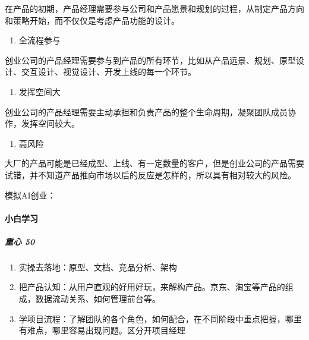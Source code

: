 \documentclass[letterpaper,10pt,english]{sphinxmanual}
\begin{document}
在产品的初期，产品经理需要参与公司和产品愿景和规划的过程，从制定产品方向和策略开始，而不仅仅是考虑产品功能的设计。
\begin{enumerate}
%
\setcounter{enumi}{1}
\item {} 
全流程参与

\end{enumerate}

创业公司的产品经理需要参与到产品的所有环节，比如从产品远景、规划、原型设计、交互设计、视觉设计、开发上线的每一个环节。
\begin{enumerate}
%
\setcounter{enumi}{2}
\item {} 
发挥空间大

\end{enumerate}

创业公司的产品经理需要主动承担和负责产品的整个生命周期，凝聚团队成员协作，发挥空间较大。
\begin{enumerate}
%
\setcounter{enumi}{3}
\item {} 
高风险

\end{enumerate}

大厂的产品可能是已经成型、上线、有一定数量的客户，但是创业公司的产品需要试错，并不知道产品推向市场以后的反应是怎样的，所以具有相对较大的风险。

模拟AI创业：


\paragraph{小白学习}
\label{\detokenize{chapter_introduction/PM:id44}}

\subparagraph{重心 50\sphinxfootnotemark[195]}
\label{\detokenize{chapter_introduction/PM:id45}}%
\begin{footnotetext}[195]\sphinxAtStartFootnote
{}
%
\end{footnotetext}\ignorespaces \begin{enumerate}
%
\item {} 
实操去落地：原型、文档、竞品分析、架构

\item {} 
把产品认知：从用户直观的好用好玩，来解构产品。京东、淘宝等产品的组成，数据流动关系、如何管理前台等。

\item {} 
学项目流程：了解团队的各个角色，如何配合，在不同阶段中重点把握，哪里有难点，哪里容易出现问题。区分开项目经理

\end{enumerate}
\end{document}
